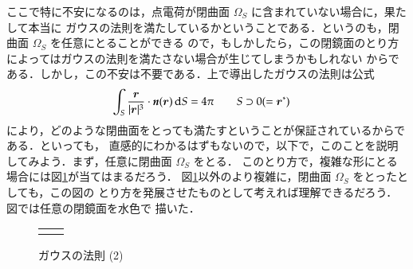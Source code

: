            ここで特に不安になるのは，点電荷が閉曲面 $\Omega_{S}$ に含まれていない場合に，果たして本当に
            ガウスの法則を満たしているかということである．というのも，閉曲面 $\Omega_{S}$ を任意にとることができる
            ので，もしかしたら，この閉鏡面のとり方によってはガウスの法則を満たさない場合が生じてしまうかもしれない
            からである．しかし，この不安は不要である．上で導出したガウスの法則は公式
                    \begin{align}
                        \int_{S}\frac{\boldsymbol{r}}{|\boldsymbol{r}|^{3}}
                        \cdot\textit{\textbf{n}}(\boldsymbol{r})\,\mathrm{d} S&=4\pi\qquad S\supset 0
                        (=\boldsymbol{r}^{*})
                    \end{align}
            により，どのような閉曲面をとっても満たすということが保証されているからである．といっても，
            直感的にわかるはずもないので，以下で，このことを説明してみよう．まず，任意に閉曲面 $\Omega_{S}$ をとる．
            このとり方で，複雑な形にとる場合には図\ref{fig:gauss_s_low2}が当てはまるだろう．
            図\ref{fig:gauss_s_low2}以外のより複雑に，閉曲面 $\Omega_{S}$ をとったとしても，この図の
            とり方を発展させたものとして考えれば理解できるだろう．図では任意の閉鏡面を水色で
            描いた．
                \begin{figure}[hbt]
                    \begin{tabular}{cc}
                        \begin{minipage}{0.5\hsize}
                            \begin{center}
                                {GaussLow2.pdf}
                                \caption{ガウスの法則 (1)}
                                \label{fig:GaussLow2}
                            \end{center}
                        \end{minipage}
                        \begin{minipage}{0.5\hsize}
                            \begin{center}
                                {gauss_s_low2.pdf}
                                \caption{ガウスの法則 (2)}
                                \label{fig:gauss_s_low2}
                            \end{center}
                        \end{minipage}
                    \end{tabular}
                \end{figure}


